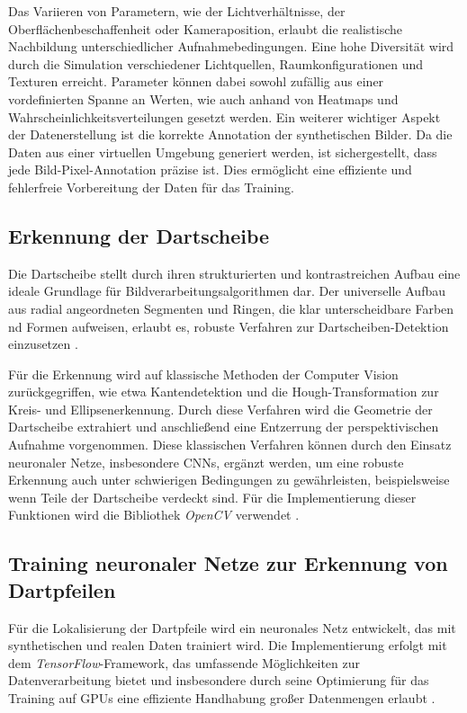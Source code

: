 Das Variieren von Parametern, wie der Lichtverhältnisse, der Oberflächenbeschaffenheit oder Kameraposition, erlaubt die realistische Nachbildung unterschiedlicher Aufnahmebedingungen. Eine hohe Diversität wird durch die Simulation verschiedener Lichtquellen, Raumkonfigurationen und Texturen erreicht. Parameter können dabei sowohl zufällig aus einer vordefinierten Spanne an Werten, wie auch anhand von Heatmaps und Wahrscheinlichkeitsverteilungen gesetzt werden. Ein weiterer wichtiger Aspekt der Datenerstellung ist die korrekte Annotation der synthetischen Bilder. Da die Daten aus einer virtuellen Umgebung generiert werden, ist sichergestellt, dass jede Bild-Pixel-Annotation präzise ist. Dies ermöglicht eine effiziente und fehlerfreie Vorbereitung der Daten für das Training.

\subsection{Erkennung der Dartscheibe}
\label{sec:implementierung:dartscheibe}

Die Dartscheibe stellt durch ihren strukturierten und kontrastreichen Aufbau eine ideale Grundlage für Bildverarbeitungsalgorithmen dar. Der universelle Aufbau aus radial angeordneten Segmenten und Ringen, die klar unterscheidbare Farben nd Formen aufweisen, erlaubt es, robuste Verfahren zur Dartscheiben-Detektion einzusetzen \cite{dra-darts-rules, wdf-darts-rules}.

Für die Erkennung wird auf klassische Methoden der Computer Vision zurückgegriffen, wie etwa Kantendetektion und die Hough-Transformation zur Kreis- und Ellipsenerkennung. Durch diese Verfahren wird die Geometrie der Dartscheibe extrahiert und anschließend eine Entzerrung der perspektivischen Aufnahme vorgenommen. Diese klassischen Verfahren können durch den Einsatz neuronaler Netze, insbesondere CNNs, ergänzt werden, um eine robuste Erkennung auch unter schwierigen Bedingungen zu gewährleisten, beispielsweise wenn Teile der Dartscheibe verdeckt sind. Für die Implementierung dieser Funktionen wird die Bibliothek \textit{OpenCV} verwendet \cite{opencv}.

\subsection{Training neuronaler Netze zur Erkennung von Dartpfeilen}
\label{sec:implementierung:ki}

Für die Lokalisierung der Dartpfeile wird ein neuronales Netz entwickelt, das mit synthetischen und realen Daten trainiert wird. Die Implementierung erfolgt mit dem \textit{TensorFlow}-Framework, das umfassende Möglichkeiten zur Datenverarbeitung bietet und insbesondere durch seine Optimierung für das Training auf GPUs eine effiziente Handhabung großer Datenmengen erlaubt \cite{tensorflow}.


